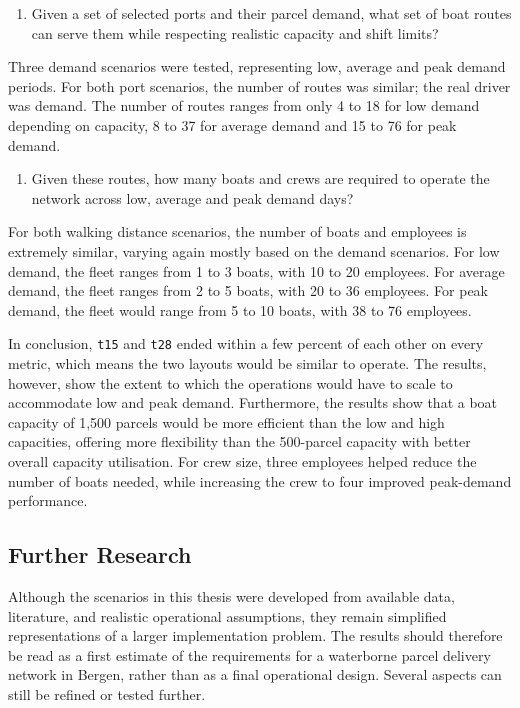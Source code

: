 \documentclass[12pt]{article}
\begin{document}
\begin{enumerate}[resume]
  \item Given a set of selected ports and their parcel demand, what set of boat routes can serve them while respecting realistic capacity and shift limits?
\end{enumerate}

Three demand scenarios were tested, representing low, average and peak demand periods. For both port scenarios, the number of routes was similar; the real driver was demand. The number of routes ranges from only 4 to 18 for low demand depending on capacity, 8 to 37 for average demand and 15 to 76 for peak demand.

\begin{enumerate}[resume]
  \item Given these routes, how many boats and crews are required to operate the network across low, average and peak demand days?
\end{enumerate}

For both walking distance scenarios, the number of boats and employees is extremely similar, varying again mostly based on the demand scenarios. For low demand, the fleet ranges from 1 to 3 boats, with 10 to 20 employees. For average demand, the fleet ranges from 2 to 5 boats, with 20 to 36 employees. For peak demand, the fleet would range from 5 to 10 boats, with 38 to 76 employees.


In conclusion, \texttt{t15} and \texttt{t28} ended within a few percent of each other on every metric, which means the two layouts would be similar to operate. The results, however, show the extent to which the operations would have to scale to accommodate low and peak demand. Furthermore, the results show that a boat capacity of 1,500 parcels would be more efficient than the low and high capacities, offering more flexibility than the 500-parcel capacity with better overall capacity utilisation. For crew size, three employees helped reduce the number of boats needed, while increasing the crew to four improved peak-demand performance.

\subsection{Further Research}
\label{subsec:further-research}

Although the scenarios in this thesis were developed from available data, literature, and realistic operational assumptions, they remain simplified representations of a larger implementation problem. The results should therefore be read as a first estimate of the requirements for a waterborne parcel delivery network in Bergen, rather than as a final operational design. Several aspects can still be refined or tested further.
\end{document}
